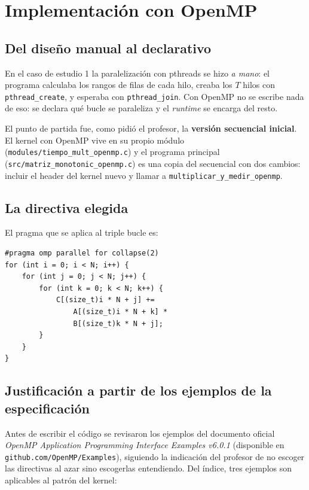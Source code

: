\section{Implementación con OpenMP}

\subsection{Del diseño manual al declarativo}

En el caso de estudio 1 la paralelización con pthreads se hizo \emph{a mano}: el programa calculaba los rangos de filas de cada hilo, creaba los $T$ hilos con \texttt{pthread\_create}, y esperaba con \texttt{pthread\_join}. Con OpenMP no se escribe nada de eso: se declara qué bucle se paraleliza y el \textit{runtime} se encarga del resto.

El punto de partida fue, como pidió el profesor, la \textbf{versión secuencial inicial}. El kernel con OpenMP vive en su propio módulo (\texttt{modules/tiempo\_mult\_openmp.c}) y el programa principal (\texttt{src/matriz\_monotonic\_openmp.c}) es una copia del secuencial con dos cambios: incluir el header del kernel nuevo y llamar a \texttt{multiplicar\_y\_medir\_openmp}.

\subsection{La directiva elegida}

El pragma que se aplica al triple bucle es:

\begin{verbatim}
#pragma omp parallel for collapse(2)
for (int i = 0; i < N; i++) {
    for (int j = 0; j < N; j++) {
        for (int k = 0; k < N; k++) {
            C[(size_t)i * N + j] +=
                A[(size_t)i * N + k] *
                B[(size_t)k * N + j];
        }
    }
}
\end{verbatim}

\subsection{Justificación a partir de los ejemplos de la especificación}

Antes de escribir el código se revisaron los ejemplos del documento oficial \textit{OpenMP Application Programming Interface Examples v6.0.1} (disponible en \texttt{github.com/OpenMP/Examples}), siguiendo la indicación del profesor de no escoger las directivas al azar sino escogerlas entendiendo. Del índice, tres ejemplos son aplicables al patrón del kernel:

